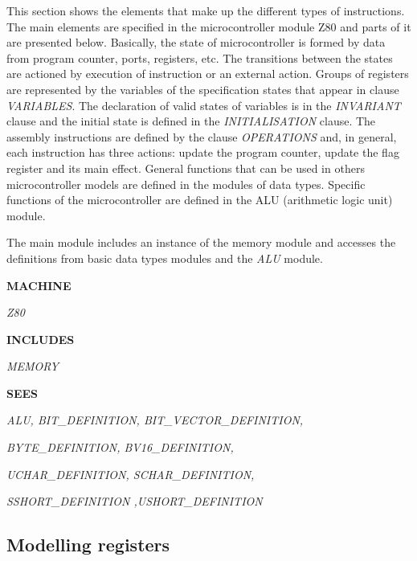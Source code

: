 \documentclass[a4paper]{llncs}
\begin{document}
This section shows the elements that make up the different types of instructions.
The main elements are specified in the microcontroller module Z80 and parts of it
are presented below.  Basically, the state of microcontroller is formed by data 
from program counter, ports, registers, etc. The transitions between the states 
are actioned by execution of instruction or an external action. Groups of registers
are represented by the variables of the specification states that appear in clause
\textit{VARIABLES}. The declaration of valid states of variables is
in the \textit{INVARIANT} clause and the initial state is defined in the
\textit{INITIALISATION} clause. The assembly instructions are defined by the
clause \textit{OPERATIONS} and, in general, each instruction has three actions: update 
the program counter, update the flag register and its main effect.
General functions that can be used in others microcontroller models are defined in
the modules of data types. Specific functions of the microcontroller are defined in the ALU (arithmetic logic unit) module.



The main module includes an instance of the memory module and accesses the definitions from basic data
types modules and the \textit{ALU} module.


\begin{sloppypar}

\bf MACHINE

\hspace*{0.15in}\it Z80

\bf INCLUDES

\hspace*{0.10in}\it MEMORY

\bf SEES

\hspace*{0.10in}\it ALU, \it BIT\_DEFINITION, \it BIT\_VECTOR\_DEFINITION,

\hspace*{0.10in}\it BYTE\_DEFINITION, \it BV16\_DEFINITION,

\hspace*{0.10in}\it UCHAR\_DEFINITION, \it SCHAR\_DEFINITION,

\hspace*{0.10in}\it SSHORT\_DEFINITION ,\it USHORT\_DEFINITION
\end{sloppypar}


\subsection{Modelling registers}
\end{document}
